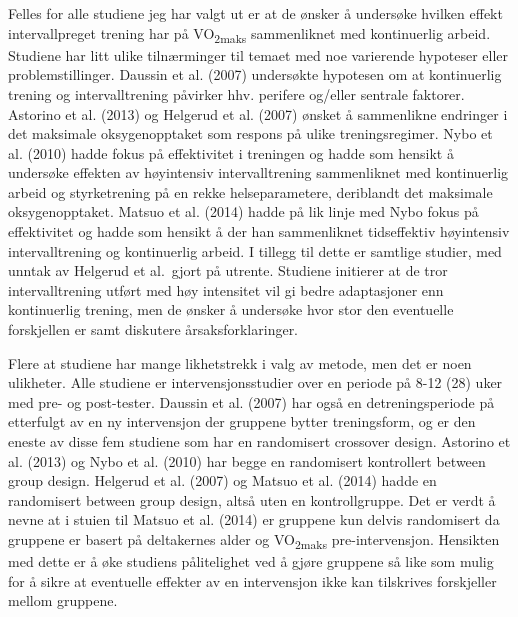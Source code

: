 \documentclass[
  letterpaper,
  DIV=11,
  numbers=noendperiod]{scrartcl}
\begin{document}
Felles for alle studiene jeg har valgt ut er at de ønsker å undersøke
hvilken effekt intervallpreget trening har på VO\textsubscript{2maks}
sammenliknet med kontinuerlig arbeid. Studiene har litt ulike
tilnærminger til temaet med noe varierende hypoteser eller
problemstillinger. Daussin et al. (2007) undersøkte hypotesen om at
kontinuerlig trening og intervalltrening påvirker hhv. perifere og/eller
sentrale faktorer. Astorino et al. (2013) og Helgerud et al. (2007)
ønsket å sammenlikne endringer i det maksimale oksygenopptaket som
respons på ulike treningsregimer. Nybo et al. (2010) hadde fokus på
effektivitet i treningen og hadde som hensikt å undersøke effekten av
høyintensiv intervalltrening sammenliknet med kontinuerlig arbeid og
styrketrening på en rekke helseparametere, deriblandt det maksimale
oksygenopptaket. Matsuo et al. (2014) hadde på lik linje med Nybo fokus
på effektivitet og hadde som hensikt å der han sammenliknet tidseffektiv
høyintensiv intervalltrening og kontinuerlig arbeid. I tillegg til dette
er samtlige studier, med unntak av Helgerud et al.~gjort på utrente.
Studiene initierer at de tror intervalltrening utført med høy intensitet
vil gi bedre adaptasjoner enn kontinuerlig trening, men de ønsker å
undersøke hvor stor den eventuelle forskjellen er samt diskutere
årsaksforklaringer.

Flere at studiene har mange likhetstrekk i valg av metode, men det er
noen ulikheter. Alle studiene er intervensjonsstudier over en periode på
8-12 (28) uker med pre- og post-tester. Daussin et al. (2007) har også
en detreningsperiode på etterfulgt av en ny intervensjon der gruppene
bytter treningsform, og er den eneste av disse fem studiene som har en
randomisert crossover design. Astorino et al. (2013) og Nybo et al.
(2010) har begge en randomisert kontrollert between group design.
Helgerud et al. (2007) og Matsuo et al. (2014) hadde en randomisert
between group design, altså uten en kontrollgruppe. Det er verdt å nevne
at i stuien til Matsuo et al. (2014) er gruppene kun delvis randomisert
da gruppene er basert på deltakernes alder og VO\textsubscript{2maks}
pre-intervensjon. Hensikten med dette er å øke studiens pålitelighet ved
å gjøre gruppene så like som mulig for å sikre at eventuelle effekter av
en intervensjon ikke kan tilskrives forskjeller mellom gruppene.
\end{document}
